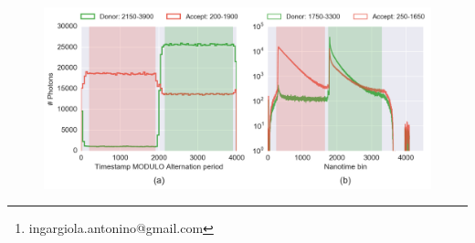 
\title{}

\usepackage{authblk}
\setcounter{Maxaffil}{1}
\author[1]{Antonino Ingargiola\thanks{ingargiola.antonino@gmail.com}}
\author[1]{Eitan Lerner}
\author[1]{SangYoon Chung}
\author[1]{Shimon Weiss}
\author[1]{Xavier Michalet}


\verbatimfont{\small}
\lstset{language=Python}

\maketitle

\begin{abstract}

\end{abstract}

\tableofcontents







\begin{figure}
\begin{center}
\includegraphics[width=\doublefig]{"figures/ALEX_alternation_double/ALEX_alternation_double"}
\caption[]{}
\end{center}
\end{figure}





